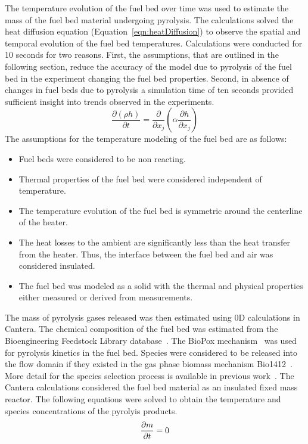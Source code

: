     The temperature evolution of the fuel bed over time was used to estimate the mass of the fuel bed material undergoing pyrolysis. The calculations solved the heat diffusion equation (Equation~\ref{eqn:heatDiffusion}) to observe the spatial and temporal evolution of the fuel bed temperatures. Calculations were conducted for 10 seconds for two reasons. First, the assumptions, that are outlined in the following section, reduce the accuracy of the model due to pyrolysis of the fuel bed in the experiment changing the fuel bed properties. Second, in absence of changes in fuel beds due to pyrolysis a simulation time of ten seconds provided sufficient insight into trends observed in the experiments. 
        \begin{equation}
            \frac{\partial \left(\rho h \right)}{\partial t} = \frac{\partial}{\partial x_{j}} \left( \alpha \frac{\partial h}{\partial x_{j}} \right)
            \label{eqn:heatDiffusion}
        \end{equation}
     The assumptions for the temperature modeling of the fuel bed are as follows:
        \begin{itemize}
            \item Fuel beds were considered to be non reacting. 
            \item Thermal properties of the fuel bed were considered independent of temperature.
            \item The temperature evolution of the fuel bed is symmetric around the centerline of the heater.
            \item The heat losses to the ambient are significantly less than the heat transfer from the heater. Thus, the interface between the fuel bed and air was considered insulated.
            \item The fuel bed was modeled as a solid with the thermal and physical properties either measured or derived from measurements.
        \end{itemize}

    
    The mass of pyrolysis gases released was then estimated using 0D calculations in Cantera. The chemical composition of the fuel bed was estimated from the Bioengineering Feedstock Library database~\cite{feedstock}. The BioPox mechanism~\cite{Dhahak2019} was used for pyrolysis kinetics in the fuel bed. Species were considered to be released into the flow domain if they existed in the gas phase biomass mechanism Bio1412~\cite{Ranzi2008}. More detail for the species selection process is available in previous work~\cite{Bean2021}. The Cantera calculations considered the fuel bed material as an insulated fixed mass reactor. The following equations were solved to obtain the temperature and species concentrations of the pyrolyis products. 
        \begin{equation}
            \pder[m]{t} = 0
        \end{equation}
        
